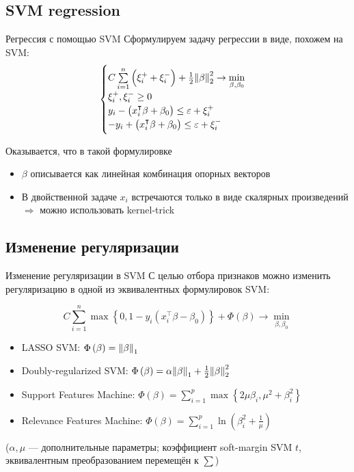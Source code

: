 \subsection{SVM regression}
\begin{frame}{Регрессия с помощью SVM}
	Сформулируем задачу регрессии в виде, похожем на SVM:
	$$
	\begin{cases}
		C\sum\limits_{i=1}^n\left(\xi_i^{+}+\xi_i^{-}\right) +\frac{1}{2}\norm{\beta}^2_2\rightarrow \min\limits_{\beta,\beta_0} \\
		\xi_i^{+}, \xi_i^{-} \geq 0 \\
		y_i - \left(x_i^\intercal \beta + \beta_0\right) \leq \varepsilon + \xi_i^{+} \\
		-y_i + \left(x_i^\intercal \beta + \beta_0\right) \leq \varepsilon + \xi_i^{-} \\
	\end{cases}
	$$

	Оказывается, что в такой формулировке
	\begin{itemize}
		\item $\beta$ описывается как линейная комбинация опорных векторов
		\item В двойственной задаче $x_i$ встречаются только в виде скалярных произведений $\Rightarrow$ можно использовать kernel-trick
	\end{itemize}

\end{frame}

\subsection{Изменение регуляризации}
\begin{frame}{Изменение регуляризации в SVM}
	С целью отбора признаков можно изменить регуляризацию в одной из
	эквивалентных формулировок SVM:

	$$
		C\sum\limits_{i=1}^n\max\left\{0, 1-y_i\left(x_i^\intercal \beta - \beta_0\right)\right\}+\Phi\left(\beta\right)\rightarrow \min\limits_{\beta,\beta_0}
	$$

	\begin{itemize}
		\item LASSO SVM: $\Phi\left(\beta\right)=\norm{\beta}_1$
		\item Doubly-regularized SVM: $\Phi\left(\beta\right)=\alpha\norm{\beta}_1+\frac{1}{2}\norm{\beta}_2^2$
		\item Support Features Machine: $\Phi\left(\beta\right)=\sum\limits_{i=1}^{p}\max\left\{2\mu\beta_i, \mu^2+\beta_i^2\right\}$
		\item Relevance Features Machine: $\Phi\left(\beta\right)=\sum\limits_{i=1}^{p}\ln\left(\beta_i^2+\frac{1}{\mu}\right)$
	\end{itemize}

    ($\alpha, \mu$ --- дополнительные параметры; коэффициент soft-margin SVM $t$, эквивалентным преобразованием перемещён к $\sum$)
\end{frame}

